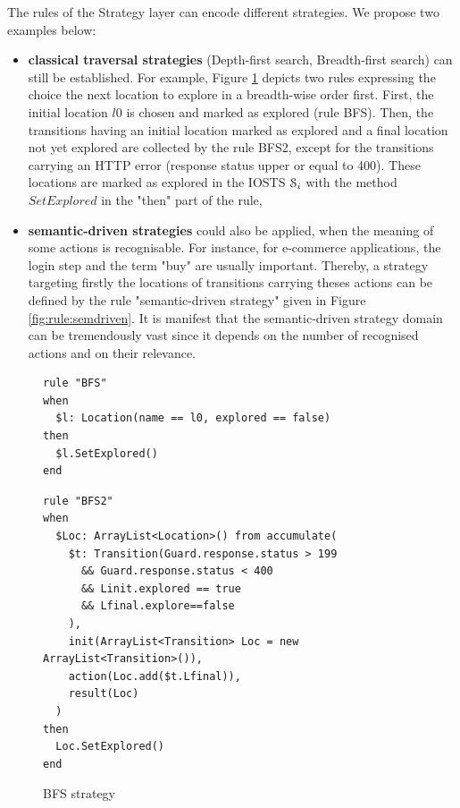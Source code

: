 The rules of the Strategy layer can encode different strategies.
We propose two examples below:

\begin{itemize}
    \item \textbf{classical traversal strategies} (Depth-first
        search, Breadth-first search) can still be established.
        For example, Figure \ref{fig:rule:bfs} depicts two rules
        expressing the choice the next location to explore in a
        breadth-wise order first. First, the initial location
        $l0$ is chosen and marked as explored (rule BFS).  Then,
        the transitions having an initial location marked as
        explored and a final location not yet explored are
        collected by the rule BFS2, except for the transitions
        carrying an HTTP error (response status upper or equal to
        400).  These locations are marked as explored in the
        IOSTS $\EuScript{S}_i$ with the method $SetExplored$ in
        the "then" part of the rule,

    \item \textbf{semantic-driven strategies} could also be
        applied, when the meaning of some actions is
        recognisable. For instance, for e-commerce applications,
        the login step and the term "buy" are usually important.
        Thereby, a strategy targeting firstly the locations of
        transitions carrying theses actions can be defined by the
        rule "semantic-driven strategy" given in Figure
        \ref{fig:rule:semdriven}.  It is manifest that the
        semantic-driven strategy domain can be tremendously vast
        since it depends on the number of recognised actions and
        on their relevance.
\end{itemize}


\begin{figure}[h]
\begin{framed}
\begin{BVerbatim}
rule "BFS"
when
  $l: Location(name == l0, explored == false)
then
  $l.SetExplored()
end
\end{BVerbatim}
\end{framed}

\begin{framed}
\begin{BVerbatim}
rule "BFS2"
when
  $Loc: ArrayList<Location>() from accumulate(
    $t: Transition(Guard.response.status > 199
      && Guard.response.status < 400
      && Linit.explored == true
      && Lfinal.explore==false
    ),
    init(ArrayList<Transition> Loc = new ArrayList<Transition>()),
    action(Loc.add($t.Lfinal)),
    result(Loc)
  )
then
  Loc.SetExplored()
end
\end{BVerbatim}
\end{framed}

\caption{BFS strategy}
\label{fig:rule:bfs}
\end{figure}

